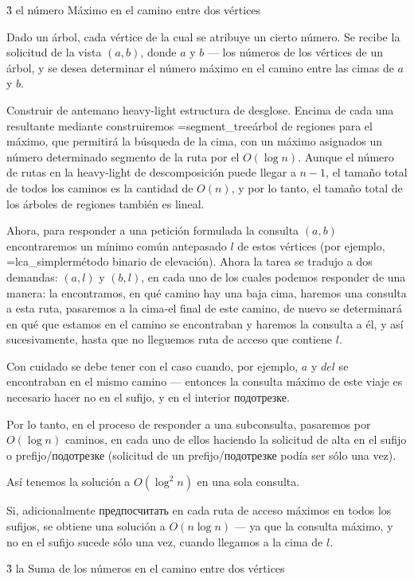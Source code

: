 \h3{ el número Máximo en el camino entre dos vértices }

Dado un árbol, cada vértice de la cual se atribuye un cierto número. Se recibe la solicitud de la vista $(a,b)$, donde $a$ y $b$ --- los números de los vértices de un árbol, y se desea determinar el número máximo en el camino entre las cimas de $a$ y $b$.

Construir de antemano heavy-light estructura de desglose. Encima de cada una resultante mediante construiremos \algohref=segment_tree{árbol de regiones para el máximo}, que permitirá la búsqueda de la cima, con un máximo asignados un número determinado segmento de la ruta por el $O (\log n)$. Aunque el número de rutas en la heavy-light de descomposición puede llegar a $n-1$, el tamaño total de todos los caminos es la cantidad de $O(n)$, y por lo tanto, el tamaño total de los árboles de regiones también es lineal.

Ahora, para responder a una petición formulada la consulta $(a,b)$ encontraremos un mínimo común antepasado $l$ de estos vértices (por ejemplo, \algohref=lca_simpler{método binario de elevación}). Ahora la tarea se tradujo a dos demandas: $(a,l)$ y $(b,l)$, en cada uno de los cuales podemos responder de una manera: la encontramos, en qué camino hay una baja cima, haremos una consulta a esta ruta, pasaremos a la cima-el final de este camino, de nuevo se determinará en qué que estamos en el camino se encontraban y haremos la consulta a él, y así sucesivamente, hasta que no lleguemos ruta de acceso que contiene $l$.

Con cuidado se debe tener con el caso cuando, por ejemplo, $a$ y $de l$ se encontraban en el mismo camino --- entonces la consulta máximo de este viaje es necesario hacer no en el sufijo, y en el interior подотрезке.

Por lo tanto, en el proceso de responder a una subconsulta, pasaremos por $O (\log n)$ caminos, en cada uno de ellos haciendo la solicitud de alta en el sufijo o prefijo/подотрезке (solicitud de un prefijo/подотрезке podía ser sólo una vez).

Así tenemos la solución a $O (\log^2 n)$ en una sola consulta.

Si, adicionalmente предпосчитать en cada ruta de acceso máximos en todos los sufijos, se obtiene una solución a $O (n \log n)$ --- ya que la consulta máximo, y no en el sufijo sucede sólo una vez, cuando llegamos a la cima de $l$.


\h3{ la Suma de los números en el camino entre dos vértices }


